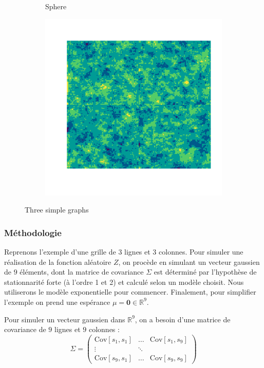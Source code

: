 \documentclass[10pt]{article} %
\begin{document}
\begin{figure}[h!]
\begin{subfigure}[b]{0.3\textwidth}
        \caption{Sphere}
        \label{fig:three sin x}
    \end{subfigure}
    \hfill
    \begin{subfigure}[b]{0.3\textwidth}
        \centering
        \includegraphics[width=\textwidth]{media/exp_2.png}
        \caption{}
        \label{fig:five over x}
    \end{subfigure}
       \caption{Three simple graphs}
       \label{fig:three graphs}
\end{figure}

\subsubsection{Méthodologie}

Reprenons l'exemple d'une grille de $3$ lignes et $3$ colonnes. Pour simuler une réalisation de la fonction aléatoire $Z$, on procède en simulant
un vecteur gaussien de $9$ éléments, dont la matrice de covariance $\Sigma$ est déterminé par l'hypothèse de stationnarité forte (à l'ordre 1 et 2) et
calculé selon un modèle choisit. Nous utiliserons le modèle exponentielle pour commencer. Finalement, pour simplifier l'exemple on prend une espérance
$\mu = \textbf{0} \in \mathbb{R}^9$.

Pour simuler un vecteur gaussien dans $\mathbb{R}^9$, on a besoin d'une matrice de covariance de $9$ lignes et $9$ colonnes :
$$
\Sigma =
\begin{pmatrix}
    \mathrm{Cov}[s_1, s_1] & \dots & \mathrm{Cov}[s_1, s_9] \\
    \vdots & \ddots & \\
    \mathrm{Cov}[s_9, s_1] & \dots & \mathrm{Cov}[s_9, s_9]
\end{pmatrix}
$$
\end{document}
